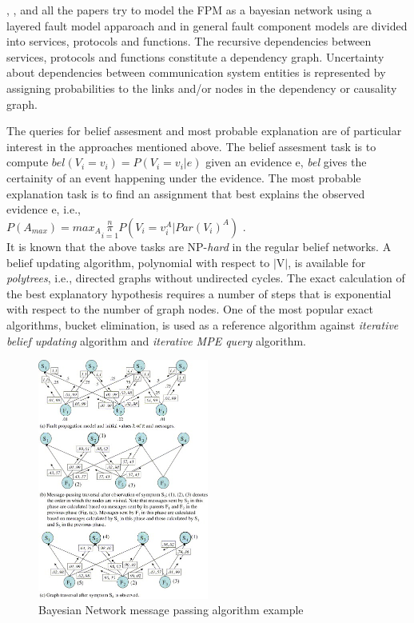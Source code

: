 \documentclass[10pt]{sigplan-proc-varsize}
\begin{document}
\cite{Cynthia:97}, \cite{Sethi:02}, \cite{Sethi:041} and \cite{Sethi:04} all the papers try to model the FPM as a bayesian network using a layered fault model apparoach and in general fault component models are divided into services, protocols and functions. The recursive dependencies between services, protocols and functions constitute a dependency graph. Uncertainty about dependencies between communication system entities is represented by assigning probabilities to the links and/or nodes in the dependency or causality graph. 

The queries for belief assesment and most probable explanation are of particular interest in the approaches mentioned above. The belief assesment task is to compute $bel(V_i=v_i) = P(V_i=v_i|e)$ given an evidence e, {\it bel}  gives the certainity of an event happening under the evidence. The most probable explanation task is to find an assignment that best explains the observed evidence e, i.e.,  \\
$P(A_{max}) = max_A \underset{i=1}{\overset{n}{\pi}} P(V_i=v_i^A | Par(V_i)^A)$ \cite{Pearl:98}. \\
It is known that the above tasks are NP-{\it hard} in the regular belief networks. A belief updating algorithm, polynomial with respect to $|$V$|$, is available for {\it polytrees}, i.e., directed graphs without undirected cycles. The exact calculation of the best explanatory hypothesis requires a number of steps that is exponential with respect to the number of graph nodes. One of the most popular exact algorithms, bucket elimination, is used as a reference algorithm against {\it iterative belief updating} algorithm and {\it iterative MPE query} algorithm.

\begin{figure}[h!]
  \caption{Bayesian Network message passing algorithm example}
  \centering
    \includegraphics[width=0.5\textwidth]{Fig7}
\end{figure}
\end{document}

